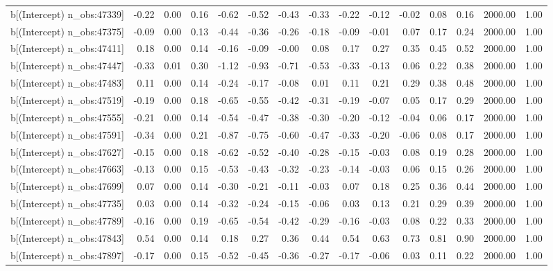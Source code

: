 \begin{table}[ht]
\begin{tabular}{rrrrrrrrrrrrrrr}
  b[(Intercept) n\_obs:47339] & -0.22 & 0.00 & 0.16 & -0.62 & -0.52 & -0.43 & -0.33 & -0.22 & -0.12 & -0.02 & 0.08 & 0.16 & 2000.00 & 1.00 \\ 
  b[(Intercept) n\_obs:47375] & -0.09 & 0.00 & 0.13 & -0.44 & -0.36 & -0.26 & -0.18 & -0.09 & -0.01 & 0.07 & 0.17 & 0.24 & 2000.00 & 1.00 \\ 
  b[(Intercept) n\_obs:47411] & 0.18 & 0.00 & 0.14 & -0.16 & -0.09 & -0.00 & 0.08 & 0.17 & 0.27 & 0.35 & 0.45 & 0.52 & 2000.00 & 1.00 \\ 
  b[(Intercept) n\_obs:47447] & -0.33 & 0.01 & 0.30 & -1.12 & -0.93 & -0.71 & -0.53 & -0.33 & -0.13 & 0.06 & 0.22 & 0.38 & 2000.00 & 1.00 \\ 
  b[(Intercept) n\_obs:47483] & 0.11 & 0.00 & 0.14 & -0.24 & -0.17 & -0.08 & 0.01 & 0.11 & 0.21 & 0.29 & 0.38 & 0.48 & 2000.00 & 1.00 \\ 
  b[(Intercept) n\_obs:47519] & -0.19 & 0.00 & 0.18 & -0.65 & -0.55 & -0.42 & -0.31 & -0.19 & -0.07 & 0.05 & 0.17 & 0.29 & 2000.00 & 1.00 \\ 
  b[(Intercept) n\_obs:47555] & -0.21 & 0.00 & 0.14 & -0.54 & -0.47 & -0.38 & -0.30 & -0.20 & -0.12 & -0.04 & 0.06 & 0.17 & 2000.00 & 1.00 \\ 
  b[(Intercept) n\_obs:47591] & -0.34 & 0.00 & 0.21 & -0.87 & -0.75 & -0.60 & -0.47 & -0.33 & -0.20 & -0.06 & 0.08 & 0.17 & 2000.00 & 1.00 \\ 
  b[(Intercept) n\_obs:47627] & -0.15 & 0.00 & 0.18 & -0.62 & -0.52 & -0.40 & -0.28 & -0.15 & -0.03 & 0.08 & 0.19 & 0.28 & 2000.00 & 1.00 \\ 
  b[(Intercept) n\_obs:47663] & -0.13 & 0.00 & 0.15 & -0.53 & -0.43 & -0.32 & -0.23 & -0.14 & -0.03 & 0.06 & 0.15 & 0.26 & 2000.00 & 1.00 \\ 
  b[(Intercept) n\_obs:47699] & 0.07 & 0.00 & 0.14 & -0.30 & -0.21 & -0.11 & -0.03 & 0.07 & 0.18 & 0.25 & 0.36 & 0.44 & 2000.00 & 1.00 \\ 
  b[(Intercept) n\_obs:47735] & 0.03 & 0.00 & 0.14 & -0.32 & -0.24 & -0.15 & -0.06 & 0.03 & 0.13 & 0.21 & 0.29 & 0.39 & 2000.00 & 1.00 \\ 
  b[(Intercept) n\_obs:47789] & -0.16 & 0.00 & 0.19 & -0.65 & -0.54 & -0.42 & -0.29 & -0.16 & -0.03 & 0.08 & 0.22 & 0.33 & 2000.00 & 1.00 \\ 
  b[(Intercept) n\_obs:47843] & 0.54 & 0.00 & 0.14 & 0.18 & 0.27 & 0.36 & 0.44 & 0.54 & 0.63 & 0.73 & 0.81 & 0.90 & 2000.00 & 1.00 \\ 
  b[(Intercept) n\_obs:47897] & -0.17 & 0.00 & 0.15 & -0.52 & -0.45 & -0.36 & -0.27 & -0.17 & -0.06 & 0.03 & 0.11 & 0.22 & 2000.00 & 1.00 \\ 

\end{tabular}
\end{table}
